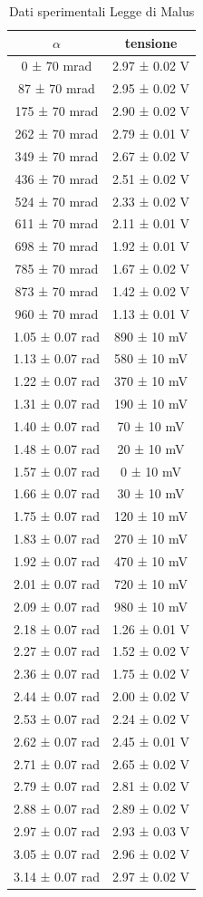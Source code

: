 \documentclass[a4paper]{article}
\begin{document}
\begin{table}[htbp]
\centering
\begin{tabular}{|c|c|}
\hline
$\alpha$ & tensione \\\hline\hline
0 ± 70 mrad & 2.97 ± 0.02 V \\
87 ± 70 mrad & 2.95 ± 0.02 V \\
175 ± 70 mrad & 2.90 ± 0.02 V \\
262 ± 70 mrad & 2.79 ± 0.01 V \\
349 ± 70 mrad & 2.67 ± 0.02 V \\
436 ± 70 mrad & 2.51 ± 0.02 V \\
524 ± 70 mrad & 2.33 ± 0.02 V \\
611 ± 70 mrad & 2.11 ± 0.01 V \\
698 ± 70 mrad & 1.92 ± 0.01 V \\
785 ± 70 mrad & 1.67 ± 0.02 V \\
873 ± 70 mrad & 1.42 ± 0.02 V \\
960 ± 70 mrad & 1.13 ± 0.01 V \\
1.05 ± 0.07 rad & 890 ± 10 mV \\
1.13 ± 0.07 rad & 580 ± 10 mV \\
1.22 ± 0.07 rad & 370 ± 10 mV \\
1.31 ± 0.07 rad & 190 ± 10 mV \\
1.40 ± 0.07 rad & 70 ± 10 mV \\
1.48 ± 0.07 rad & 20 ± 10 mV \\
1.57 ± 0.07 rad & 0 ± 10 mV \\
1.66 ± 0.07 rad & 30 ± 10 mV \\
1.75 ± 0.07 rad & 120 ± 10 mV \\
1.83 ± 0.07 rad & 270 ± 10 mV \\
1.92 ± 0.07 rad & 470 ± 10 mV \\
2.01 ± 0.07 rad & 720 ± 10 mV \\
2.09 ± 0.07 rad & 980 ± 10 mV \\
2.18 ± 0.07 rad & 1.26 ± 0.01 V \\
2.27 ± 0.07 rad & 1.52 ± 0.02 V \\
2.36 ± 0.07 rad & 1.75 ± 0.02 V \\
2.44 ± 0.07 rad & 2.00 ± 0.02 V \\
2.53 ± 0.07 rad & 2.24 ± 0.02 V \\
2.62 ± 0.07 rad & 2.45 ± 0.01 V \\
2.71 ± 0.07 rad & 2.65 ± 0.02 V \\
2.79 ± 0.07 rad & 2.81 ± 0.02 V \\
2.88 ± 0.07 rad & 2.89 ± 0.02 V \\
2.97 ± 0.07 rad & 2.93 ± 0.03 V \\
3.05 ± 0.07 rad & 2.96 ± 0.02 V \\
3.14 ± 0.07 rad & 2.97 ± 0.02 V \\
\hline
\end{tabular}
\caption{Dati sperimentali Legge di Malus}
\label{tab: dati Malus}
\end{table}
\end{document}
